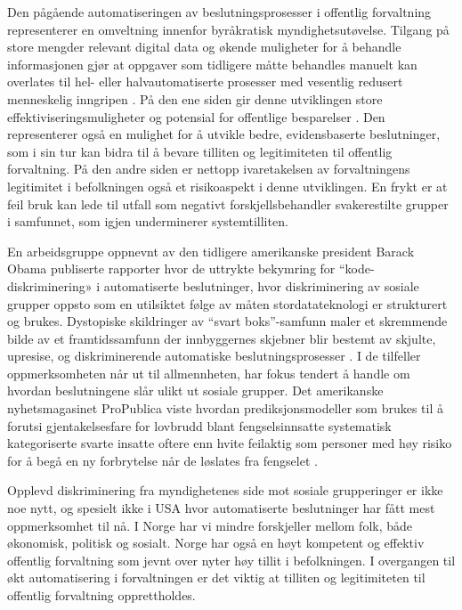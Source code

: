 \documentclass[
]{book}
\begin{document}
Den pågående automatiseringen av beslutningsprosesser i offentlig forvaltning representerer en omveltning innenfor byråkratisk myndighetsutøvelse.
Tilgang på store mengder relevant digital data og økende muligheter for å behandle informasjonen gjør at oppgaver som tidligere måtte behandles manuelt kan overlates til hel- eller halvautomatiserte prosesser med vesentlig redusert menneskelig inngripen \citep{zarsky2016trouble}.
På den ene siden gir denne utviklingen store effektiviseringsmuligheter og potensial for offentlige besparelser \citep{duwe2017effects}.
Den representerer også en mulighet for å utvikle bedre, evidensbaserte beslutninger, som i sin tur kan bidra til å bevare tilliten og legitimiteten til offentlig forvaltning.
På den andre siden er nettopp ivaretakelsen av forvaltningens legitimitet i befolkningen også et risikoaspekt i denne utviklingen.
En frykt er at feil bruk kan lede til utfall som negativt forskjellsbehandler svakerestilte grupper i samfunnet, som igjen underminerer systemtilliten.

En arbeidsgruppe oppnevnt av den tidligere amerikanske president Barack Obama publiserte rapporter hvor de uttrykte bekymring for ``kode-diskriminering» i automatiserte beslutninger, hvor diskriminering av sosiale grupper oppsto som en utilsiktet følge av måten stordatateknologi er strukturert og brukes.
Dystopiske skildringer av ``svart boks''-samfunn maler et skremmende bilde av et framtidssamfunn der innbyggernes skjebner blir bestemt av skjulte, upresise, og diskriminerende automatiske beslutningsprosesser \citep{barocas2016big, pasquale2015black}.
I de tilfeller oppmerksomheten når ut til allmennheten, har fokus tendert å handle om hvordan beslutningene slår ulikt ut sosiale grupper.
Det amerikanske nyhetsmagasinet ProPublica viste hvordan prediksjonsmodeller som brukes til å forutsi gjentakelsesfare for lovbrudd blant fengselsinnsatte systematisk kategoriserte svarte insatte oftere enn hvite feilaktig som personer med høy risiko for å begå en ny forbrytelse når de løslates fra fengselet \citep{angwin2016machine}.

Opplevd diskriminering fra myndighetenes side mot sosiale grupperinger er ikke noe nytt, og spesielt ikke i USA hvor automatiserte beslutninger har fått mest oppmerksomhet til nå.
I Norge har vi mindre forskjeller mellom folk, både økonomisk, politisk og sosialt.
Norge har også en høyt kompetent og effektiv offentlig forvaltning som jevnt over nyter høy tillit i befolkningen.
I overgangen til økt automatisering i forvaltningen er det viktig at tilliten og legitimiteten til offentlig forvaltning opprettholdes.
\end{document}
